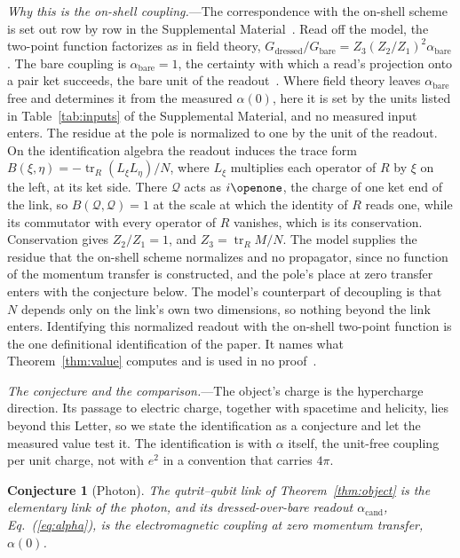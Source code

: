 \documentclass[aps,prl,reprint,superscriptaddress,longbibliography,nofootinbib,floatfix]{revtex4-2}
\newtheorem{conjecture}{Conjecture}
\theoremstyle{definition}
\newcommand{\tr}{\operatorname{tr}}
\begin{document}
\emph{Why this is the on-shell coupling.}---The correspondence with the on-shell scheme is set out row by row in the Supplemental Material~\cite{SM}. Read off the model, the two-point function factorizes as in field theory, $G_{\mathrm{dressed}}/G_{\mathrm{bare}}=Z_{3}(Z_{2}/Z_{1})^{2}\alpha_{\mathrm{bare}}$. The bare coupling is $\alpha_{\mathrm{bare}}=1$, the certainty with which a read's projection onto a pair ket succeeds, the bare unit of the readout~\cite{SM}. Where field theory leaves $\alpha_{\mathrm{bare}}$ free and determines it from the measured $\alpha(0)$, here it is set by the units listed in Table~\ref{tab:inputs} of the Supplemental Material, and no measured input enters. The residue at the pole is normalized to one by the unit of the readout. On the identification algebra the readout induces the trace form $B(\xi,\eta)=-\tr_{R}(L_{\xi}L_{\eta})/N$, where $L_{\xi}$ multiplies each operator of $R$ by $\xi$ on the left, at its ket side. There $\mathcal{Q}$ acts as $i\openone$, the charge of one ket end of the link, so $B(\mathcal{Q},\mathcal{Q})=1$ at the scale at which the identity of $R$ reads one, while its commutator with every operator of $R$ vanishes, which is its conservation. Conservation gives $Z_{2}/Z_{1}=1$, and $Z_{3}=\tr_{R}M/N$. The model supplies the residue that the on-shell scheme normalizes and no propagator, since no function of the momentum transfer is constructed, and the pole's place at zero transfer enters with the conjecture below. The model's counterpart of decoupling is that $N$ depends only on the link's own two dimensions, so nothing beyond the link enters. Identifying this normalized readout with the on-shell two-point function is the one definitional identification of the paper. It names what Theorem~\ref{thm:value} computes and is used in no proof~\cite{SM}.

\emph{The conjecture and the comparison.}---The object's charge is the hypercharge direction. Its passage to electric charge, together with spacetime and helicity, lies beyond this Letter, so we state the identification as a conjecture and let the measured value test it. The identification is with $\alpha$ itself, the unit-free coupling per unit charge, not with $e^{2}$ in a convention that carries $4\pi$.

\begin{conjecture}[Photon]
\label{conj:photon}
The qutrit--qubit link of Theorem~\ref{thm:object} is the elementary link of the photon, and its dressed-over-bare readout $\alpha_{\mathrm{cand}}$, Eq.~(\ref{eq:alpha}), is the electromagnetic coupling at zero momentum transfer, $\alpha(0)$.
\end{conjecture}
\end{document}
